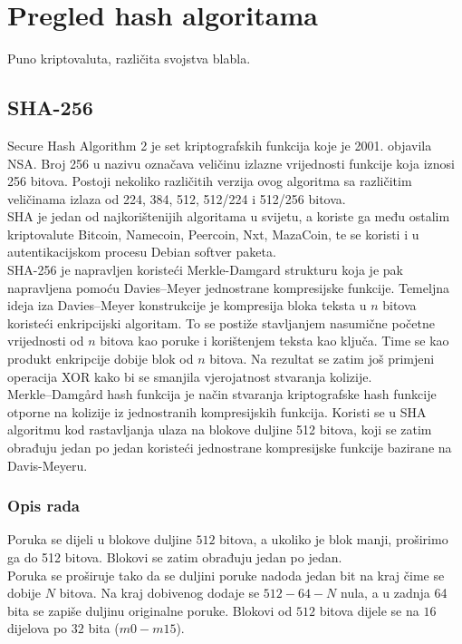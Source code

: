 \documentclass[12pt]{article}
\begin{document}
\pagebreak
\section{Pregled hash algoritama}
Puno kriptovaluta, različita svojstva blabla.


\subsection{SHA-256}
Secure Hash Algorithm 2 je set kriptografskih funkcija koje je 2001. objavila NSA. Broj 256 u nazivu označava veličinu izlazne vrijednosti funkcije koja iznosi 256 bitova. Postoji nekoliko različitih verzija ovog algoritma sa različitim veličinama izlaza od 224, 384, 512, 512/224 i 512/256 bitova. \\
SHA je jedan od najkorištenijih algoritama u svijetu, a koriste ga među ostalim kriptovalute Bitcoin, Namecoin, Peercoin, Nxt, MazaCoin, te se koristi i u autentikacijskom procesu Debian softver paketa. \\
SHA-256 je napravljen koristeći Merkle-Damgard strukturu koja je pak napravljena pomoću Davies–Meyer jednostrane kompresijske funkcije. Temeljna ideja iza Davies–Meyer konstrukcije je kompresija bloka teksta u $n$ bitova koristeći enkripcijski algoritam. To se postiže stavljanjem nasumične početne vrijednosti od $n$ bitova kao poruke i korištenjem teksta kao ključa. Time se kao produkt enkripcije dobije blok od $n$ bitova. Na rezultat se zatim još primjeni operacija XOR kako bi se smanjila vjerojatnost stvaranja kolizije. \\
Merkle–Damgård hash funkcija je način stvaranja kriptografske hash funkcije otporne na kolizije iz jednostranih kompresijskih funkcija. Koristi se u SHA algoritmu kod rastavljanja ulaza na blokove duljine 512 bitova, koji se zatim obrađuju jedan po jedan koristeći jednostrane kompresijske funkcije bazirane na Davis-Meyeru.

\subsubsection{Opis rada}
Poruka se dijeli u blokove duljine $512$ bitova, a ukoliko je blok manji, proširimo ga do 512 bitova. Blokovi se zatim obrađuju jedan po jedan.\\
Poruka se proširuje tako da se duljini poruke  nadoda jedan bit na kraj čime se dobije $N$ bitova. Na kraj dobivenog dodaje se $512 - 64 - N$ nula, a u zadnja 64 bita se zapiše duljinu originalne poruke.
Blokovi od $512$ bitova dijele se na $16$ dijelova po $32$ bita ($m0 - m15$).\\
\end{document}
